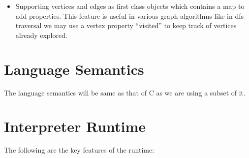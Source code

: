 \documentclass[12,twoside]{article}
\begin{document}
\begin{itemize}
\begin{itemize}
      \item Supporting vertices and edges as first class objects which contains 
      a map to add properties. This feature is useful in various graph 
      algorithms like in dfs traversal we may use a vertex property ``visited'' 
      to keep track of vertices already explored.
    \end{itemize}
  \end{itemize}
  


\section{Language Semantics}
The language semantics will be same as that of C as we are using a subset of it.

\section{Interpreter Runtime}
The following are the key features of the runtime:
\end{document}
